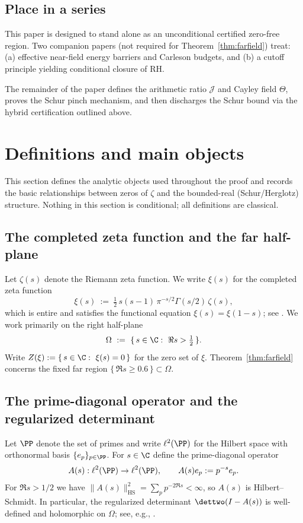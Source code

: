 \documentclass[11pt]{article}
\begin{document}
\subsection*{Place in a series}
This paper is designed to stand alone as an unconditional certified zero-free region.
Two companion papers (not required for Theorem~\ref{thm:farfield}) treat: (a) effective near-field energy barriers and Carleson budgets, and (b) a cutoff principle yielding conditional closure of RH.

\medskip
\noindent The remainder of the paper defines the arithmetic ratio $\mathcal J$ and Cayley field $\Theta$, proves the Schur pinch mechanism, and then discharges the Schur bound via the hybrid certification outlined above.

\section{Definitions and main objects}\label{sec:defs}

This section defines the analytic objects used throughout the proof and records the basic relationships between zeros of $\zeta$ and the bounded-real (Schur/Herglotz) structure.
Nothing in this section is conditional; all definitions are classical.

\subsection*{The completed zeta function and the far half-plane}
Let $\zeta(s)$ denote the Riemann zeta function.
We write $\xi(s)$ for the completed zeta function
\[
  \xi(s)\ :=\ \tfrac12\,s(s-1)\,\pi^{-s/2}\Gamma(s/2)\,\zeta(s),
\]
which is entire and satisfies the functional equation $\xi(s)=\xi(1-s)$; see \cite{Titchmarsh}.
We work primarily on the right half-plane
\[
  \Omega\ :=\ \{\,s\in\C:\ \Re s>\tfrac12\,\}.
\]
Write $Z(\xi):=\{\,s\in\C:\ \xi(s)=0\,\}$ for the zero set of $\xi$.
Theorem~\ref{thm:farfield} concerns the fixed far region $\{\,\Re s\ge 0.6\,\}\subset\Omega$.

\subsection*{The prime-diagonal operator and the regularized determinant}
Let $\PP$ denote the set of primes and write $\ell^2(\PP)$ for the Hilbert space with orthonormal basis $\{e_p\}_{p\in\PP}$.
For $s\in\C$ define the prime-diagonal operator
\[
  A(s):\ell^2(\PP)\to\ell^2(\PP),\qquad A(s)e_p:=p^{-s}e_p.
\]
For $\Re s>1/2$ we have $\|A(s)\|_{\mathrm{HS}}^2=\sum_{p}p^{-2\Re s}<\infty$, so $A(s)$ is Hilbert--Schmidt.
In particular, the regularized determinant $\dettwo(I-A(s))$ is well-defined and holomorphic on $\Omega$; see, e.g., \cite[Ch.~III]{RosenblumRovnyak}.
\end{document}
